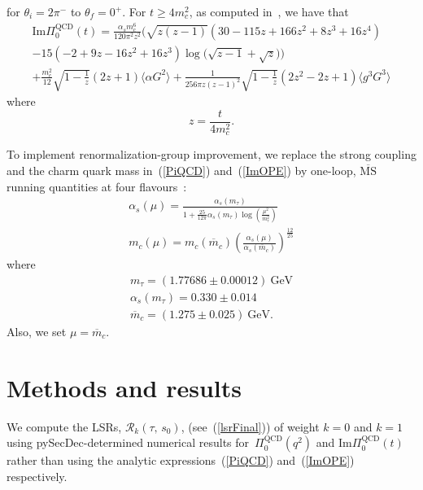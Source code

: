 \documentclass[12pt, letterpaper]{article}
\renewcommand{\Im}{\mathrm{Im}}
\newcommand{\lsr}{\mathcal{R}}
\newcommand{\vev}[1]{\ensuremath{\langle #1\rangle}}
\newcommand{\aGG}{\vev{\alpha G^2}}
\newcommand{\gggGGG}{\vev{g^3 G^3}}
\newcommand{\gev}{\ensuremath{\text{GeV}}}
\begin{document}
for $\theta_{i}=2\pi^{-}$ to $\theta_f=0^{+}$.
For $t\geq4m_c^2$, as computed in~\cite{Berg:2012gd}, we have that
\begin{multline}\label{ImOPE}
  \Im\Pi_0^{\text{QCD}}(t) = \frac{\alpha_s m_c^6}{120\pi^2 z^2}
    \Bigg(
      \sqrt{z(z-1)}(30-115z+166z^2+8z^3+16z^4)\\
      -15(-2+9z-16z^2+16z^3)\log\big(\sqrt{z-1}+\sqrt{z}\big)
    \Bigg)\\
  + \frac{m_c^2}{12}\sqrt{1-\frac{1}{z}}(2z+1)\aGG
  + \frac{1}{256\pi z(z-1)^2}\sqrt{1-\frac{1}{z}}(2z^2-2z+1)\gggGGG
\end{multline}
where
\begin{equation}
  z=\frac{t}{4m_c^2}.
\end{equation}

To implement renormalization-group improvement, we replace the strong coupling 
and the charm quark mass in~(\ref{PiQCD}) and~(\ref{ImOPE}) by 
one-loop, $\overline{\text{MS}}$ running quantities at four flavours~\cite{Narison:1981ts}:
\begin{gather}
  \alpha_{s}(\mu) = \frac{\alpha_{s}\left(m_{\tau}\right)}%
    {1+\frac{25}{12\pi}\alpha_{s}\left(m_{\tau}\right)
    \log(\frac{\mu^2}{m_{\tau}^2})} 
  \label{runningCoupling}\\
  m_c(\mu) = m_c(\overline{m}_c)\left(\frac{\alpha_s(\mu)}{\alpha_s(\overline{m}_c)}\right)^\frac{12}{25}
  \label{runningMass} 
\end{gather}
where~\cite{Olive:2016xmw} 
\begin{gather}
  m_{\tau} = (1.77686\pm 0.00012)\ \gev\\
  \alpha_s(m_{\tau}) = 0.330\pm 0.014 \label{alphatau}\\
  \overline{m}_c = (1.275\pm 0.025)\ \gev. \label{mcbar}
\end{gather}
Also, we set $\mu=\overline{m}_c$.
%
%
\section{Methods and results}\label{methods}
%
We compute the LSRs, $\lsr_k(\tau,\, s_0)$, (see~(\ref{lsrFinal})) of weight $k=0$ and $k=1$  
using pySecDec-determined numerical results for~$\Pi^{\text{QCD}}_0(q^2)$ 
and $\Im\Pi_0^{\text{QCD}}(t)$
rather than using the analytic expressions~(\ref{PiQCD}) and~(\ref{ImOPE}) respectively.
\end{document}

